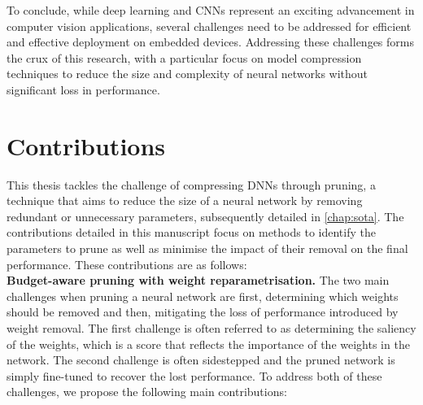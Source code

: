 To conclude, while deep learning and \acp{CNN} represent an exciting advancement
in computer vision applications, several challenges need to be addressed for
efficient and effective deployment on embedded devices. Addressing these
challenges forms the crux of this research, with a particular focus on model
compression techniques to reduce the size and complexity of neural networks
without significant loss in performance.\\


\section{Contributions}

This thesis tackles the challenge of compressing \acp{DNN} through pruning, a
technique that aims to reduce the size of a neural network by removing redundant
or unnecessary parameters, subsequently detailed in \cref{chap:sota}. The
contributions detailed in this manuscript focus on methods to identify the
parameters to prune as well as minimise the impact of their removal on the final
performance. These contributions are as follows:\\

\noindent \textbf{Budget-aware pruning with weight reparametrisation.} The two
main challenges when pruning a neural network are first, determining which
weights should be removed and then, mitigating the loss of performance
introduced by weight removal. The first challenge is often referred to as
determining the saliency of the weights, which is a score that reflects the
importance of the weights in the network. The second challenge is often
sidestepped and the pruned network is simply fine-tuned to recover the lost
performance. To address both of these challenges, we propose the following main
contributions:

